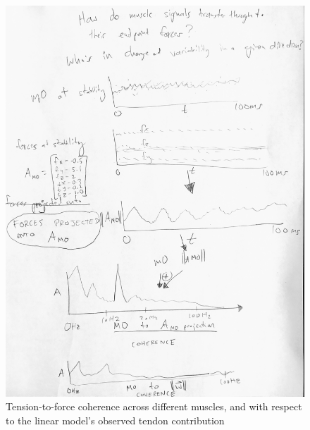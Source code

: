 \documentclass[utf8]{frontiersSCNS} %
\begin{document}
\begin{figure}[h!]
\begin{center}
\includegraphics[width=17.5cm]{figures/muscle_force_coherence/muscle_force_coherence.jpg}%
\end{center}
\caption{Tension-to-force coherence across different muscles, and with respect to the linear model's observed tendon contribution}
\label{fig:muscle_force_coherence}
\end{figure}
\end{document}
